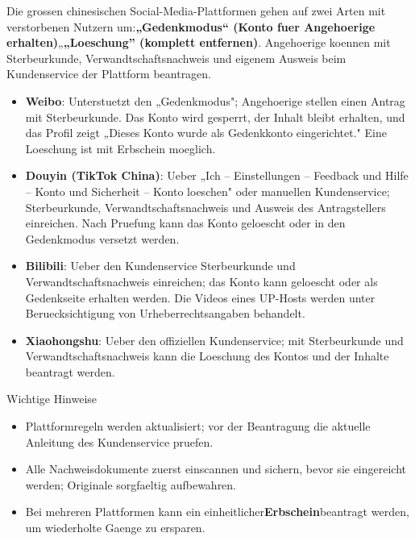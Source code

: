 
Die grossen chinesischen Social-Media-Plattformen gehen auf zwei Arten mit verstorbenen Nutzern um:\textbf{„Gedenkmodus“ (Konto fuer Angehoerige erhalten)}„\textbf{„Loeschung” (komplett entfernen)}. Angehoerige koennen mit Sterbeurkunde, Verwandtschaftsnachweis und eigenem Ausweis beim Kundenservice der Plattform beantragen.

\begin{itemize}
  \item \textbf{Weibo}: Unterstuetzt den „Gedenkmodus"; Angehoerige stellen einen Antrag mit Sterbeurkunde. Das Konto wird gesperrt, der Inhalt bleibt erhalten, und das Profil zeigt „Dieses Konto wurde als Gedenkkonto eingerichtet." Eine Loeschung ist mit Erbschein moeglich.
  \item \textbf{Douyin (TikTok China)}: Ueber „Ich – Einstellungen – Feedback und Hilfe – Konto und Sicherheit – Konto loeschen" oder manuellen Kundenservice; Sterbeurkunde, Verwandtschaftsnachweis und Ausweis des Antragstellers einreichen. Nach Pruefung kann das Konto geloescht oder in den Gedenkmodus versetzt werden.
  \item \textbf{Bilibili}: Ueber den Kundenservice Sterbeurkunde und Verwandtschaftsnachweis einreichen; das Konto kann geloescht oder als Gedenkseite erhalten werden. Die Videos eines UP-Hosts werden unter Beruecksichtigung von Urheberrechtsangaben behandelt.
  \item \textbf{Xiaohongshu}: Ueber den offiziellen Kundenservice; mit Sterbeurkunde und Verwandtschaftsnachweis kann die Loeschung des Kontos und der Inhalte beantragt werden.
\end{itemize}

\begin{tcbinfo}{Wichtige Hinweise}
\begin{itemize}
  \item Plattformregeln werden aktualisiert; vor der Beantragung die aktuelle Anleitung des Kundenservice pruefen.
  \item Alle Nachweisdokumente zuerst einscannen und sichern, bevor sie eingereicht werden; Originale sorgfaeltig aufbewahren.
  \item Bei mehreren Plattformen kann ein einheitlicher\textbf{Erbschein}beantragt werden, um wiederholte Gaenge zu ersparen.
\end{itemize}

\end{tcbinfo}

